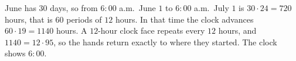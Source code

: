 June has $30$ days, so from $6{:}00$ a.m.\ June $1$ to $6{:}00$ a.m.\ July $1$ is $30\cdot24=720$ hours, that is $60$ periods of $12$ hours. In that time the clock advances $60\cdot19=1140$ hours. A $12$-hour clock face repeats every $12$ hours, and $1140=12\cdot95$, so the hands return exactly to where they started. The clock shows $\boxed{6{:}00}$.
